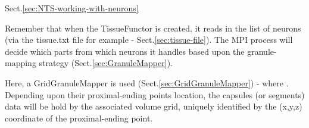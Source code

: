 

 Sect.\ref{sec:NTS-working-with-neurons}


Remember that when the TissueFunctor is created, it reads in the list of neurons
(via the tissue.txt file for example - Sect.\ref{sec:tissue-file}). 
The MPI process will decide which parts from which neurons it handles based
upon the granule-mapping strategy (Sect.\ref{sec:GranuleMapper}).


Here, a GridGranuleMapper is used (Sect.\ref{sec:GridGranuleMapper}) - where .
Depending upon their proximal-ending points location, the capsules (or segments)
data will be hold by the associated volume grid, uniquely identified by the
(x,y,z) coordinate of the proximal-ending point.

% 


